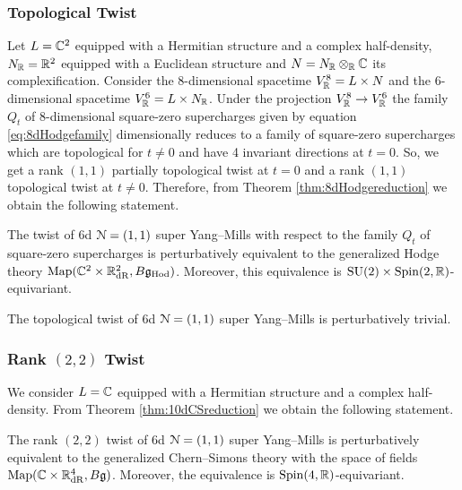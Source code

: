 \documentclass[10pt, oneside]{article}
\begin{document}
\subsubsection{Topological Twist}
\label{sect:6d11topologicaltwist}

Let $L=\mathbb C^2$ equipped with a Hermitian structure and a complex half-density, $N_\mathbb R=\mathbb R^2$ equipped with a Euclidean structure and $N=N_\mathbb R\otimes_\mathbb R\mathbb C$ its complexification. Consider the 8-dimensional spacetime $V^8_\mathbb R=L\times N$ and the 6-dimensional spacetime $V^6_\mathbb R=L\times N_\mathbb R$. Under the projection $V^8_\mathbb R\rightarrow V^6_\mathbb R$ the family $Q_t$ of 8-dimensional square-zero supercharges given by equation \eqref{eq:8dHodgefamily} dimensionally reduces to a family of square-zero supercharges which are topological for $t\neq 0$ and have 4 invariant directions at $t=0$. So, we get a rank $(1, 1)$ partially topological twist at $t=0$ and a rank $(1, 1)$ topological twist at $t\neq 0$. Therefore, from Theorem \ref{thm:8dHodgereduction} we obtain the following statement.

\begin{theorem}
The twist of 6d $\mathcal N=(1, 1)$ super Yang--Mills with respect to the family $Q_t$ of square-zero supercharges is perturbatively equivalent to the generalized Hodge theory $\operatorname{Map}(\mathbb C^2\times \mathbb R^2_{\mathrm{dR}}, B\mathfrak g_{\mathrm{Hod}})$. Moreover, this equivalence is $\mathrm{SU}(2)\times \mathrm{Spin}(2, \mathbb R)$-equivariant.
\label{thm:6dHodgetwist}
\end{theorem}

\begin{corollary}
The topological twist of 6d $\mathcal N=(1, 1)$ super Yang--Mills is perturbatively trivial.
\end{corollary}

\subsubsection{Rank \texorpdfstring{$(2, 2)$}{(2,2)} Twist}
\label{sect:6drank22twist}

We consider $L=\mathbb C$ equipped with a Hermitian structure and a complex half-density. From Theorem \ref{thm:10dCSreduction} we obtain the following statement.

\begin{theorem}
The rank $(2, 2)$ twist of 6d $\mathcal N=(1, 1)$ super Yang--Mills is perturbatively equivalent to the generalized Chern--Simons theory with the space of fields $\operatorname{Map}(\mathbb C\times \mathbb R^4_{\mathrm{dR}}, B\mathfrak g)$. Moreover, the equivalence is $\mathrm{Spin}(4, \mathbb R)$-equivariant.
\label{thm:6drank22}
\end{theorem}
\end{document}

